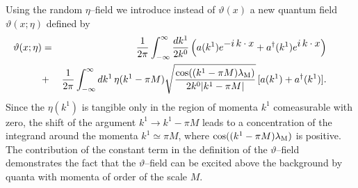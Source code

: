 \documentclass[a4paper,12pt] {article}
\begin{document}
Using the random $\eta$--field we introduce instead of $\vartheta(x)$
a new quantum field $\vartheta(x;\eta)$ defined by
%
\begin{eqnarray}\label{label3.17}
\hspace{-0.3in}\vartheta(x;\eta) &=&\frac{1}{2\pi}
\int^{\infty}_{-\infty}\frac{dk^1}{2k^0}\,\Big(a(k^1)e^{\textstyle
-i\,k\cdot x} + a^{\dagger}(k^1)e^{\textstyle i\,k\cdot
x}\Big)\nonumber\\ &+&\frac{1}{2\pi}
\int^{\infty}_{-\infty}dk^1\,\eta(k^1 - \pi M)\sqrt{\frac{\cos((k^1 -
\pi M)\lambda_{\rm M})}{2k^0|k^1 - \pi M|}}\,[a(k^1) +
a^{\dagger}(k^1)].
\end{eqnarray}
%
Since the $\eta(k^1)$ is tangible only in the region of momenta $k^1$
comeasurable with zero, the shift of the argument $k^1 \to k^1 - \pi
M$ leads to a concentration of the integrand around the momenta
$k^1\simeq \pi M$, where $\cos((k^1 -\pi M)\lambda_{\rm M})$ is
positive. The contribution of the constant term in the definition of
the $\vartheta$--field demonstrates the fact that the
$\vartheta$--field can be excited above the background by quanta with
momenta of order of the scale $M$.
\end{document}
